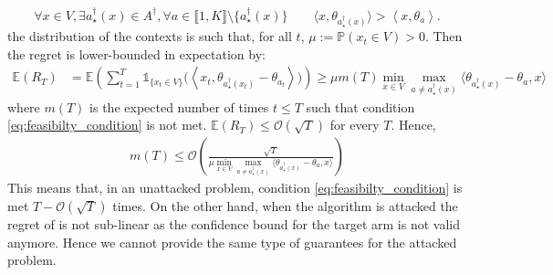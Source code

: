 \begin{equation*}    
\forall x\in V, \exists a^{\dagger}_{\star}(x)\in A^\dagger, \forall a\in \llbracket 1, K\rrbracket\setminus\{a^{\dagger}_{\star}(x)\} \qquad \langle x, \theta_{a^{\dagger}_{\star}(x)}\rangle > \left\langle x, \theta_{a}\right\rangle.
\end{equation*}
 the distribution of the contexts is such that, for all $t$, $\mu := \mathbb{P}\left(x_{t}\in V\right) >0$.
Then\changebr{,} the regret is lower-bounded in expectation by:
\begin{align*}
    \mathbb{E}(R_{T}) &= \mathbb{E}\left(\sum_{t=1}^{T} \mathds{1}_{\{x_{t}\in V\}}\big( \left\langle x_{t}, \theta_{a^{\dagger}_{\star}(x_{t})} - \theta_{a_{t}}\right\rangle\big)\right) \geq \mu m(T) \min_{x\in V} \max_{a\neq a^{\dagger}_\star(x)} \langle \theta_{a^{\dagger}_{\star}(x)} - \theta_{a}, x\rangle
\end{align*}
where $m(T)$ is the expected number of times $t\leq T$ such that condition \eqref{eq:feasibilty_condition} is not met.   $\mathbb{E}(R_{T}) \leq \mathcal{O}(\sqrt{T})$ for every $T$. Hence, 
\begin{align*}
    m(T) \leq \mathcal{O}\left(\frac{\sqrt{T}}{\mu\min_{x\in V}\max_{a\neq a^{\dagger}_\star(x)} \langle \theta_{a^{\dagger}_{\star}(x)} - \theta_{a}, x\rangle}\right)
\end{align*}
This means that, in an unattacked problem, condition \eqref{eq:feasibilty_condition} is met $T - \mathcal{O}(\sqrt{T})$ times. On the other hand, when the algorithm is attacked the regret of \linucb is not sub-linear as the confidence bound for the target arm is not valid anymore. Hence we cannot provide the same type of guarantees for the attacked problem.


